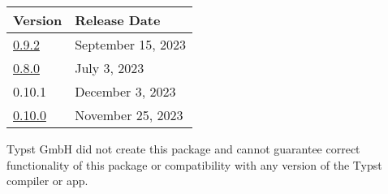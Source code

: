 \begin{longtable}[]{@{}ll@{}}
\toprule\noalign{}
Version & Release Date \\
\midrule\noalign{}
\endhead
\bottomrule\noalign{}
\endlastfoot
\href{https://typst.app/universe/package/rubby/0.9.2/}{0.9.2} &
September 15, 2023 \\
\href{https://typst.app/universe/package/rubby/0.8.0/}{0.8.0} & July 3,
2023 \\
0.10.1 & December 3, 2023 \\
\href{https://typst.app/universe/package/rubby/0.10.0/}{0.10.0} &
November 25, 2023 \\
\end{longtable}

Typst GmbH did not create this package and cannot guarantee correct
functionality of this package or compatibility with any version of the
Typst compiler or app.
